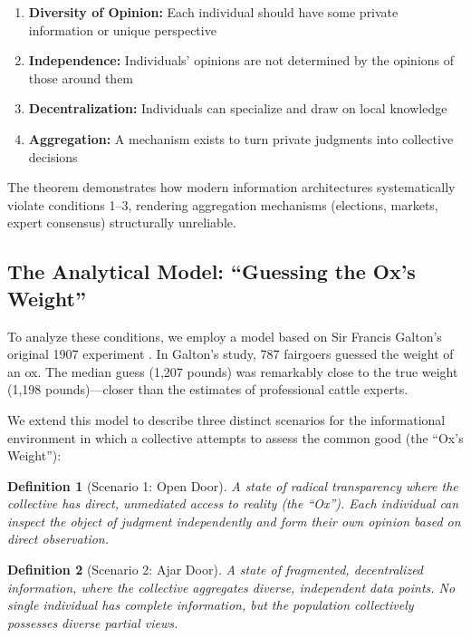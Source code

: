 \documentclass[11pt,a4paper]{article}
\newtheorem{definition}{Definition}[section]
\begin{document}
\begin{enumerate}
    \item \textbf{Diversity of Opinion:} Each individual should have some private information or unique perspective
    \item \textbf{Independence:} Individuals' opinions are not determined by the opinions of those around them
    \item \textbf{Decentralization:} Individuals can specialize and draw on local knowledge
    \item \textbf{Aggregation:} A mechanism exists to turn private judgments into collective decisions
\end{enumerate}

The theorem demonstrates how modern information architectures systematically violate conditions 1--3, rendering aggregation mechanisms (elections, markets, expert consensus) structurally unreliable.

\subsection{The Analytical Model: ``Guessing the Ox's Weight''}

To analyze these conditions, we employ a model based on Sir Francis Galton's original 1907 experiment \citep{Galton1907}. In Galton's study, 787 fairgoers guessed the weight of an ox. The median guess (1,207 pounds) was remarkably close to the true weight (1,198 pounds)---closer than the estimates of professional cattle experts.

We extend this model to describe three distinct scenarios for the informational environment in which a collective attempts to assess the common good (the ``Ox's Weight''):

\begin{definition}[Scenario 1: Open Door]
A state of radical transparency where the collective has direct, unmediated access to reality (the ``Ox''). Each individual can inspect the object of judgment independently and form their own opinion based on direct observation.
\end{definition}

\begin{definition}[Scenario 2: Ajar Door]
A state of fragmented, decentralized information, where the collective aggregates diverse, independent data points. No single individual has complete information, but the population collectively possesses diverse partial views.
\end{definition}
\end{document}

